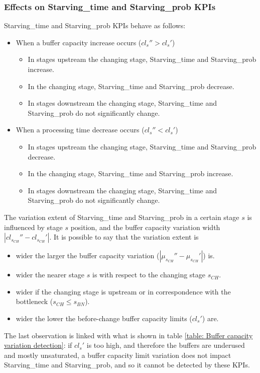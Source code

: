 \subsubsection{Effects on Starving\_time and Starving\_prob KPIs}
Starving\_time and Starving\_prob KPIs behave as follows:
\begin{itemize}
\item When a buffer capacity increase occurs ($cl_s''>cl_s'$)
\begin{itemize}
\item In stages upstream the changing stage, Starving\_time and Starving\_prob increase.
\item In the changing stage, Starving\_time and Starving\_prob decrease.
\item In stages downstream the changing stage, Starving\_time and Starving\_prob do not significantly change.
\end{itemize}
\item When a processing time decrease occurs ($cl_s''<cl_s'$)
\begin{itemize}
\item In stages upstream the changing stage, Starving\_time and Starving\_prob decrease.
\item In the changing stage, Starving\_time and Starving\_prob increase.
\item In stages downstream the changing stage, Starving\_time and Starving\_prob do not significantly change.
\end{itemize}
\end{itemize}
The variation extent of Starving\_time and Starving\_prob in a certain stage $s$ is influenced by stage $s$ position, and the buffer capacity variation width $|cl_{s_{CH}}''-cl_{s_{CH}}'|$. It is possible to say that the variation extent is 
\begin{itemize}
\item wider the larger the buffer capacity variation ($|\mu_{s_{CH}}''-\mu_{s_{CH}}'|$) is.
\item wider the nearer stage $s$ is with respect to the changing stage $s_{CH}$.
\item wider if the changing stage is upstream or in correspondence with the bottleneck ($s_{CH}\leqslant s_{BN}$).
\item wider the lower the before-change buffer capacity limits ($cl_s'$) are.
\end{itemize}
The last observation is linked with what is shown in table \ref{table: Buffer capacity variation detection}: if $cl_s'$ is too high, and therefore the buffers are underused and mostly unsaturated, a buffer capacity limit variation does not impact Starving\_time and Starving\_prob, and so it cannot be detected by these KPIs. 
